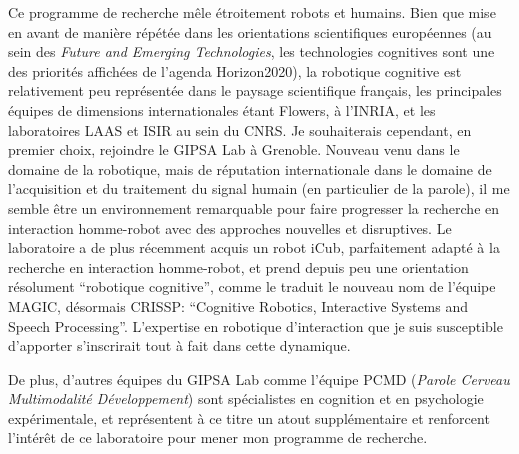 \documentclass[a4paper]{article}
\begin{document}
Ce programme de recherche mêle étroitement robots et humains. Bien que mise en
avant de manière répétée dans les orientations scientifiques européennes (au
sein des \emph{Future and Emerging Technologies}, les technologies
cognitives sont une des priorités affichées de l'agenda Horizon2020), la
robotique cognitive est relativement peu représentée dans le paysage
scientifique français, les principales équipes de dimensions internationales
étant Flowers, à l'INRIA, et les laboratoires LAAS et ISIR au sein du CNRS. Je
souhaiterais cependant, en premier choix, rejoindre le GIPSA Lab à Grenoble.
Nouveau venu dans le domaine de la robotique, mais de réputation internationale
dans le domaine de l'acquisition et du traitement du signal humain (en
particulier de la parole), il me semble être un environnement remarquable pour
faire progresser la recherche en interaction homme-robot avec des approches
nouvelles et disruptives. Le laboratoire a de plus récemment acquis un robot
iCub, parfaitement adapté à la recherche en interaction homme-robot, et prend
depuis peu une orientation résolument ``robotique cognitive'', comme le traduit
le nouveau nom de l'équipe MAGIC, désormais CRISSP: ``Cognitive Robotics,
Interactive Systems and Speech Processing''.  L'expertise en robotique
d'interaction que je suis susceptible d'apporter s'inscrirait tout à fait dans
cette dynamique.

De plus, d'autres équipes du GIPSA Lab comme l'équipe PCMD (\emph{Parole
Cerveau Multimodalité Développement}) sont spécialistes en cognition et en
psychologie expérimentale, et représentent à ce titre un atout supplémentaire et
renforcent l'intérêt de ce laboratoire pour mener mon programme de recherche.

\printbibliography
\end{document}
